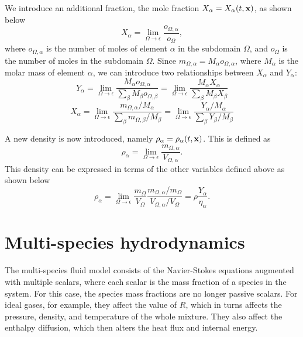 \documentclass[oneside,a4paper,11pt]{report}
\begin{document}
We introduce an additional fraction, the mole fraction $X_\alpha = X_\alpha(t,\mathbf{x})$, as shown below
\begin{equation}
    X_\alpha = \lim_{\Omega \to \epsilon} \frac{o_{\Omega,\alpha}}{o_\Omega},
\end{equation}
where $o_{\Omega,\alpha}$ is the number of moles of element $\alpha$ in the subdomain $\Omega$, and $o_\Omega$ is the number of moles in the subdomain $\Omega$. Since $m_{\Omega,\alpha} = M_\alpha o_{\Omega,\alpha}$, where $M_\alpha$ is the molar mass of element $\alpha$, we can introduce two relationships between $X_\alpha$ and $Y_\alpha$:
\begin{equation}
\label{eq:y_intermsof_x}
    Y_\alpha = \lim_{\Omega \to \epsilon} \frac{M_\alpha o_{\Omega,\alpha}}{\sum_\beta M_\beta o_{\Omega,\beta}} = \lim_{\Omega \to \epsilon} \frac{M_\alpha X_\alpha}{\sum_\beta M_\beta X_\beta}
\end{equation}
\begin{equation}
\label{eq:x_intermsof_y}
    X_\alpha = \lim_{\Omega \to \epsilon} \frac{m_{\Omega,\alpha} / M_\alpha}{\sum_\beta m_{\Omega,\beta} / M_\beta} = \lim_{\Omega \to \epsilon} \frac{Y_\alpha / M_\alpha}{ \sum_\beta Y_\beta / M_\beta}
\end{equation}

A new density is now introduced, namely $\rho_\alpha = \rho_\alpha(t,\mathbf{x})$. This is defined as 
\begin{equation}
    \rho_\alpha = \lim_{\Omega \to \epsilon} \frac{ m_{\Omega,\alpha} }{ V_{\Omega,\alpha} }.
\end{equation}
This density can be expressed in terms of the other variables defined above as shown below
\begin{equation}
    \label{eq:relation_volume_density_mass}
    \rho_\alpha = \lim_{\Omega \to \epsilon} \frac{m_\Omega}{V_\Omega} \frac{ m_{\Omega,\alpha} / m_\Omega }{ V_{\Omega,\alpha} / V_{\Omega} } = \rho \frac{Y_\alpha}{\eta_\alpha}.
\end{equation}

\section{Multi-species hydrodynamics}
\label{sec:multi_species_hydro}
The multi-species fluid model consists of the Navier-Stokes equations augmented with multiple scalars, where each scalar is the mass fraction of a species in the system. For this case, the species mass fractions are no longer passive scalars. For ideal gases, for example, they affect the value of $R$, which in turns affects the pressure, density, and temperature of the whole mixture. They also affect the enthalpy diffusion, which then alters the heat flux and internal energy. 
\end{document}
